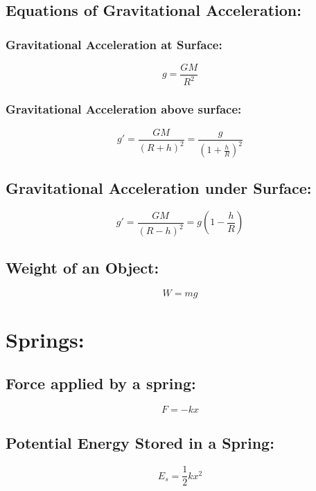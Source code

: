 \documentclass[a4paper]{report}
\begin{document}
        \subsection{Equations of Gravitational Acceleration: }
            \subsubsection{Gravitational Acceleration at Surface: }
                \begin{equation}
                    g = \frac{GM}{R^2}
                \end{equation}
            \subsubsection{Gravitational Acceleration above surface: }
                \begin{equation}
                    g' = \frac{GM}{(R+h)^2} = \frac{g}{(1+\frac{h}{R})^2}
                \end{equation}
            \subsection{Gravitational Acceleration under Surface: }
                \begin{equation}
                    g' = \frac{GM}{(R-h)^2} = g(1-\frac{h}{R})
                \end{equation}
        \subsection{Weight of an Object: }
            \begin{equation}
                W = mg
            \end{equation}
    \section{Springs: }
        \subsection{Force applied by a spring: }
            \begin{equation}
                F = -kx
            \end{equation}
        \subsection{Potential Energy Stored in a Spring: }
            \begin{equation}
                E_s = \frac{1}{2}kx^2
            \end{equation}
\end{document}
